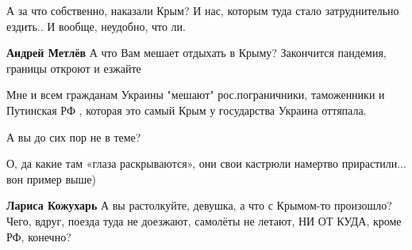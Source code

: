 \begin{itemize}
 
А за что собственно, наказали Крым?
И нас, которым туда стало затруднительно ездить.. И вообще, неудобно, что ли.

\begin{itemize}
 
\textbf{Андрей Метлёв} А что Вам мешает отдыхать в Крыму? Закончится пандемия, границы откроют и езжайте

 

Мне и всем гражданам Украины "мешают" рос.пограничники, таможенники и Путинская
РФ , которая это самый Крым у государства Украина оттяпала.

А вы до сих пор не в теме?

 
О, да какие там «глаза раскрываются», они свои кастрюли намертво прирастили... вон пример выше)

 
\textbf{Лариса Кожухарь} А вы растолкуйте, девушка, а что с Крымом-то
произошло? Чего, вдруг, поезда туда не доезжают, самолёты не летают, НИ ОТ
КУДА, кроме РФ, конечно?

 

\end{itemize}
\end{itemize}
